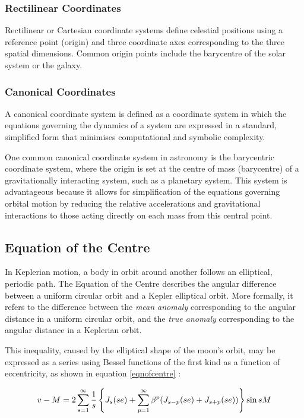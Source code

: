 \documentclass[fleqn,10pt]{olplainarticle}
\numberwithin{equation}{subsection}
\begin{document}
\subsubsection{Rectilinear Coordinates}
Rectilinear or Cartesian coordinate systems define celestial positions using a reference point (origin) and three coordinate axes corresponding to the three spatial dimensions. Common origin points include the barycentre of the solar system or the galaxy. \cite{Karttunen2016-gt}

\subsubsection{Canonical Coordinates}
A canonical coordinate system is defined as a coordinate system in which the equations governing the dynamics of a system are expressed in a standard, simplified form that minimises computational and symbolic complexity.

One common canonical coordinate system in astronomy is the barycentric coordinate system, where the origin is set at the centre of mass (barycentre) of a gravitationally interacting system, such as a planetary system. This system is advantageous because it allows for simplification of the equations governing orbital motion by reducing the relative accelerations and gravitational interactions to those acting directly on each mass from this central point. 

\subsection{Equation of the Centre} \label{EqnOfCentreSection}
In Keplerian motion, a body in orbit around another follows an elliptical, periodic path. The Equation of the Centre describes the angular difference between a uniform circular orbit and a Kepler elliptical orbit. More formally, it refers to the difference between the \textit{mean anomaly} corresponding to the angular distance in a uniform circular orbit, and the \textit{true anomaly} corresponding to the angular distance in a Keplerian orbit.

This inequality, caused by the elliptical shape of the moon's orbit, may be expressed as a series using Bessel functions of the first kind as a function of eccentricity, as shown in equation \eqref{eqnofcentre} \cite{brown1896introductory}:

\begin{equation} \label{eqnofcentre}
v - M = 2 \sum_{s = 1}^{\infty}\frac{1}{s} \left\{ J_s(se) + \sum_{p = 1}^{\infty} \beta^{p} (J_{s-p}(se) + J_{s+p}(se)) \right\} \sin{sM}\\
\end{equation}
\end{document}
